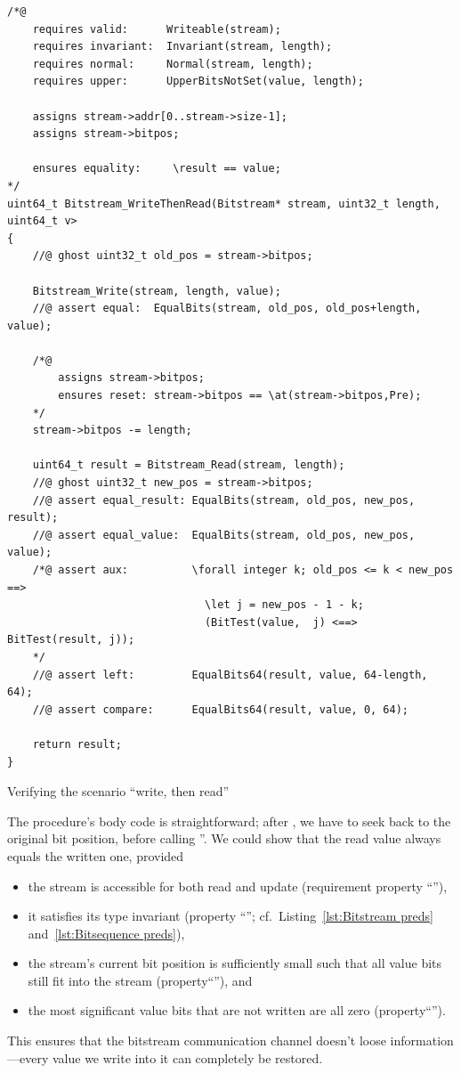 \begin{listing}[hbt]
\begin{minipage}{0.99\textwidth}
\begin{lstlisting}[style=acsl-block]
/*@
    requires valid:      Writeable(stream);
    requires invariant:  Invariant(stream, length);
    requires normal:     Normal(stream, length);
    requires upper:      UpperBitsNotSet(value, length);

    assigns stream->addr[0..stream->size-1];
    assigns stream->bitpos;

    ensures equality:     \result == value;
*/
uint64_t Bitstream_WriteThenRead(Bitstream* stream, uint32_t length, uint64_t v>
{
    //@ ghost uint32_t old_pos = stream->bitpos;

    Bitstream_Write(stream, length, value);
    //@ assert equal:  EqualBits(stream, old_pos, old_pos+length, value);

    /*@ 
        assigns stream->bitpos;
        ensures reset: stream->bitpos == \at(stream->bitpos,Pre);
    */
    stream->bitpos -= length;

    uint64_t result = Bitstream_Read(stream, length);
    //@ ghost uint32_t new_pos = stream->bitpos;
    //@ assert equal_result: EqualBits(stream, old_pos, new_pos, result);
    //@ assert equal_value:  EqualBits(stream, old_pos, new_pos, value);
    /*@ assert aux:          \forall integer k; old_pos <= k < new_pos ==>
                               \let j = new_pos - 1 - k;
                               (BitTest(value,  j) <==> BitTest(result, j));
    */
    //@ assert left:         EqualBits64(result, value, 64-length, 64);
    //@ assert compare:      EqualBits64(result, value, 0, 64);

    return result;
}
\end{lstlisting}
\end{minipage}
\caption{\label{lst:Bitstream_WriteThenRead}
	Verifying the scenario ``write, then read'' }
\end{listing}

\FloatBarrier

The procedure's body code is straightforward; after
, we have to seek back to the original bit
position, before calling ''.
%
We could show that the read value always equals the written one,
provided
\begin{itemize}
\item the stream is accessible for both read and update
	(requirement property ``''),
\item it satisfies its type invariant (property
	``''; cf.\ Listing~\ref{lst:Bitstream preds}
	and~\ref{lst:Bitsequence preds}),
\item the stream's current bit position is sufficiently small such that
	all value bits still fit into the stream
	(property``''), and
\item the most significant value bits that are not written are all zero
	(property``'').
\end{itemize}
%
This ensures that the bitstream communication channel doesn't loose
information---every value we write into it can completely be
restored.



